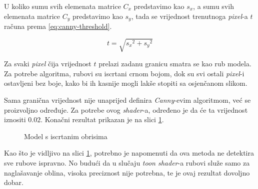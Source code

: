 U koliko sumu svih elemenata matrice $C_x$ predstavimo kao $s_x$, a sumu svih elemenata matrice $C_y$ predstavimo kao $s_y$, tada se vrijednost trenutnoga \emph{pixel}-a $t$ računa prema \ref{eq:canny-threshold}.

\begin{equation}
\label{eq:canny-threshold}
	t = \sqrt{{s_x}^2 + {s_y}^2}
\end{equation}

Za svaki \emph{pixel} čija vrijednost $t$ prelazi zadanu granicu smatra se kao rub modela. Za potrebe algoritma, rubovi su iscrtani crnom bojom, dok su svi ostali \emph{pixel}-i ostavljeni bez boje, kako bi ih kasnije mogli lakše stopiti sa osjenčanom slikom.

Sama granična vrijednost nije unaprijed definira \emph{Canny}-evim algoritmom, već se proizvoljno određuje. Za potrebe ovog \emph{shader}-a, određeno je da će ta vrijednost iznositi $0.02$. Konačni rezultat prikazan je na slici \ref{fig:monkey-edges}.

\begin{figure}[H]
\centering{}
\caption{Model s iscrtanim obrisima}
\label{fig:monkey-edges}
\end{figure}

Kao što je vidljivo na slici \ref{fig:monkey-edges}, potrebno je napomenuti da ova metoda ne detektira sve rubove ispravno. No budući da u slučaju \emph{toon shader}-a rubovi služe samo za naglašavanje oblina, visoka preciznost nije potrebna, te je ovaj rezultat dovoljno dobar.

